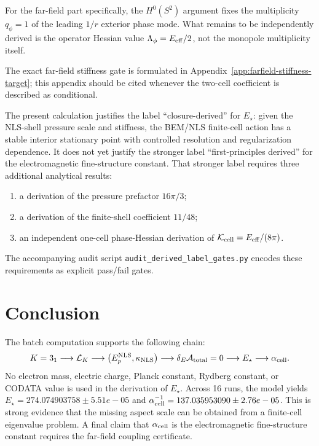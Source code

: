 \documentclass[11pt]{article}
\newcommand{\LK}{\mathcal L_K}
\newcommand{\Estar}{E_\star}
\newcommand{\alphacell}{\alpha_{\rm cell}}
\begin{document}
For the far-field part specifically, the \(H^0(S^2)\) argument fixes the
multiplicity \(q_\phi=1\) of the leading \(1/r\) exterior phase mode.  What
remains to be independently derived is the operator Hessian value
\(\Lambda_\phi=E_{\rm eff}/2\), not the monopole multiplicity itself.


The exact far-field stiffness gate is formulated in Appendix~\ref{app:farfield-stiffness-target}; this appendix should be cited whenever the two-cell coefficient is described as conditional.


\label{sec:derived-label-status}

The present calculation justifies the label ``closure-derived'' for
\(E_\star\): given the NLS-shell pressure scale and stiffness, the BEM/NLS
finite-cell action has a stable interior stationary point with controlled
resolution and regularization dependence.  It does not yet justify the stronger
label ``first-principles derived'' for the electromagnetic fine-structure
constant.  That stronger label requires three additional analytical results:
\begin{enumerate}
\item a derivation of the pressure prefactor \(16\pi/3\);
\item a derivation of the finite-shell coefficient \(11/48\);
\item an independent one-cell phase-Hessian derivation of
      \(\mathcal K_{\rm cell}=E_{\rm eff}/(8\pi)\).
\end{enumerate}
The accompanying audit script \texttt{audit\_derived\_label\_gates.py} encodes
these requirements as explicit pass/fail gates.

\section{Conclusion}

The batch computation supports the following chain:
\[
K=3_1
\longrightarrow
\LK
\longrightarrow
\left(E_p^{\rm NLS},\kappa_{\rm NLS}\right)
\longrightarrow
\delta_E\mathcal A_{\rm total}=0
\longrightarrow
\Estar
\longrightarrow
\alphacell.
\]
No electron mass, electric charge, Planck constant, Rydberg constant, or CODATA value is used in the derivation of \(\Estar\). Across 16 runs, the model yields \(\Estar=274.074903758\pm 5.51e-05\) and \(\alphacell^{-1}=137.035953090\pm 2.76e-05\). This is strong evidence that the missing aspect scale can be obtained from a finite-cell eigenvalue problem. A final claim that \(\alphacell\) is the electromagnetic fine-structure constant requires the far-field coupling certificate.
\end{document}

